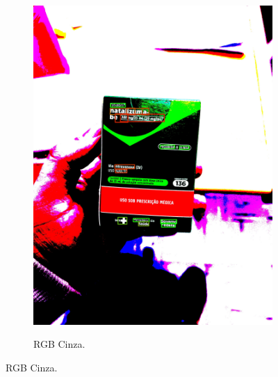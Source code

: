 \begin{figure}[htb]
\begin{subfigure}[b]{0.21\textwidth}
        \includegraphics[width=\linewidth]{../pictures/tysabri_rgb_thresh_boxes.jpg}
    \end{subfigure}
    \hfill
    \begin{subfigure}[b]{0.21\textwidth}
        \centering
        \caption{RGB Cinza.}
        \label{fig:foto:versoes:2:RGB_Cinza:boxes}

\end{subfigure}
\end{figure}
